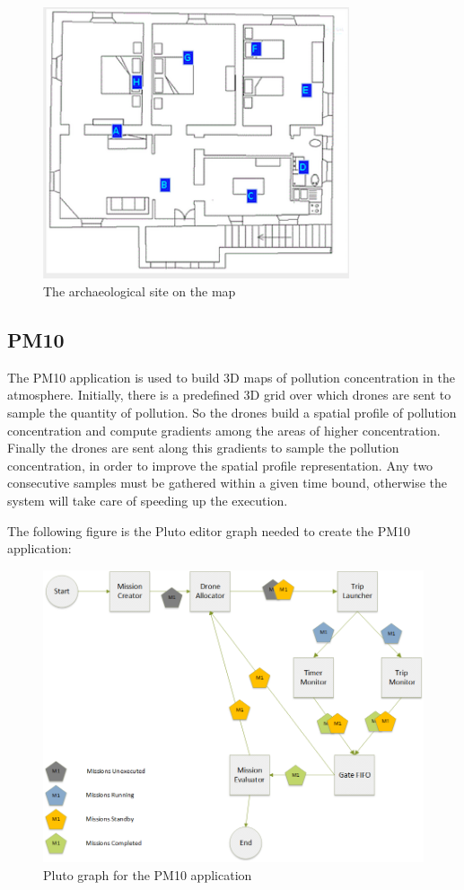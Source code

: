  \begin{figure}[H]
 \centering
 \includegraphics[width=\linewidth, height=8cm]{pictures/area3.png}
 \caption{The archaeological site on the map}
 \label{fig:area3}
 \end{figure}



\subsection{PM10}

The PM10\cite{pm10} application is used to build 3D maps of pollution concentration in the atmosphere. 
Initially, there is a predefined 3D grid over which drones are sent to sample the quantity of pollution.
So the drones build a spatial profile of pollution concentration and compute gradients among the areas of higher concentration.
Finally the drones are sent along this gradients to sample the pollution concentration, in order to improve the spatial profile representation.
Any two consecutive samples must be gathered within a given time bound, otherwise the system will take care of speeding up the execution.

The following figure is the Pluto editor graph needed to create the PM10 application:

\begin{figure}[H]
  \centering
  \includegraphics[width=\linewidth]{pictures/Putti_Diagram.png}
  \caption{Pluto graph for the PM10 application}
  \label{fig:pm10Graph}
\end{figure}


